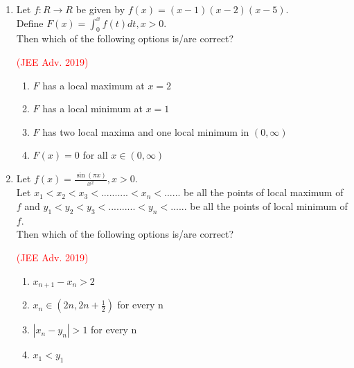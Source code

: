 \documentclass[journal,12pt,twocolumn]{IEEEtran}
\theoremstyle{remark}
\begin{document}
\begin{enumerate}[start = 7]
{\begin{flushleft}
\begin{enumerate}
            \end{enumerate}
        \end{flushleft}
        }
    \item{
        \begin{flushleft}
            Let $f: R\rightarrow R$ be given by $f(x) = (x-1)(x-2)(x-5)$.\\[6pt] 
            Define $F(x) = \displaystyle\int_0^x f(t)dt, x>0$.\\[3pt]
            Then which of the following options is/are correct?
            \begin{flushright}
                \textcolor{red}{(JEE Adv. 2019)}
            \end{flushright}
            \begin{enumerate}
                \item $F$ has a local maximum at $x=2$
                \item $F$ has a local minimum at $x=1$
                \item $F$ has two local maxima and one local minimum in $(0,\infty)$
                \item $F(x) = 0$ for all $x \in (0,\infty)$
            \end{enumerate}
        \end{flushleft}
        }
    \item{
        \begin{flushleft}
            Let $f(x) = \displaystyle\frac{\sin(\pi x)}{x^2}, x>0$.\\[3pt]
            Let $x_1 < x_2 < x_3 < .......... <x_n <......$ be all the points of local maximum of $f$ and $y_1 < y_2 < y_3 < .......... <y_n <......$ be all the points of local minimum of $f$.\\
            Then which of the following options is/are correct?
            \begin{flushright}
                \textcolor{red}{(JEE Adv. 2019)}
            \end{flushright}
            \begin{enumerate}
                \item $x_{n+1} - x_{n} > 2$ 
                \item $x_{n} \in (2n, 2n+\frac{1}{2})$ for every n
                \item $|x_{n} - y_{n}|> 1 $ for every n
                \item $x_{1} < y_{1}$
            \end{enumerate}
        \end{flushleft}
        }
    \end{enumerate}
\end{document}
